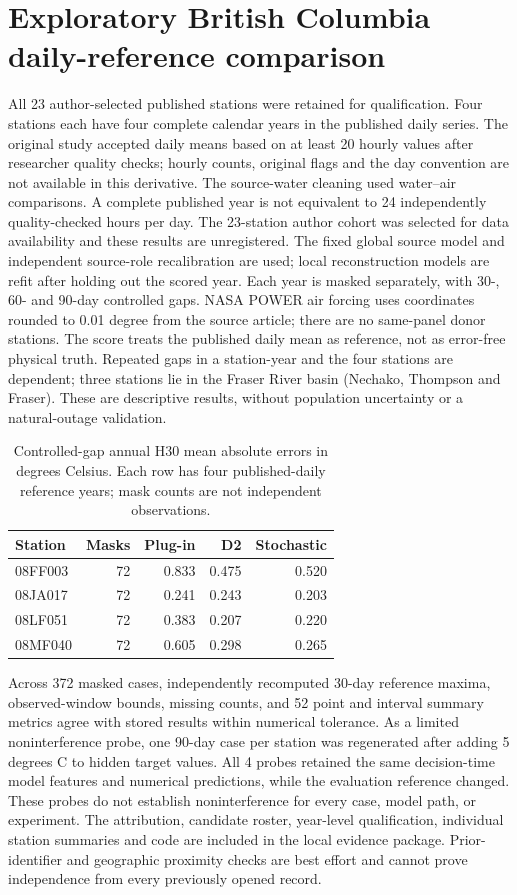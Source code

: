 \section{Exploratory British Columbia daily-reference comparison}
All 23 author-selected published stations were retained for qualification. Four stations each have four complete calendar years in the published daily series. The original study accepted daily means based on at least 20 hourly values after researcher quality checks; hourly counts, original flags and the day convention are not available in this derivative. The source-water cleaning used water--air comparisons. A complete published year is not equivalent to 24 independently quality-checked hours per day. The 23-station author cohort was selected for data availability and these results are unregistered.
The fixed global source model and independent source-role recalibration are used; local reconstruction models are refit after holding out the scored year. Each year is masked separately, with 30-, 60- and 90-day controlled gaps. NASA POWER air forcing uses coordinates rounded to 0.01 degree from the source article; there are no same-panel donor stations. The score treats the published daily mean as reference, not as error-free physical truth. Repeated gaps in a station-year and the four stations are dependent; three stations lie in the Fraser River basin (Nechako, Thompson and Fraser). These are descriptive results, without population uncertainty or a natural-outage validation.
\begin{table}[h]\centering\caption{Controlled-gap annual H30 mean absolute errors in degrees Celsius. Each row has four published-daily reference years; mask counts are not independent observations.}\begin{tabular}{lrrrr}\toprule Station & Masks & Plug-in & D2 & Stochastic \\ \midrule
08FF003 & 72 & 0.833 & 0.475 & 0.520 \\
08JA017 & 72 & 0.241 & 0.243 & 0.203 \\
08LF051 & 72 & 0.383 & 0.207 & 0.220 \\
08MF040 & 72 & 0.605 & 0.298 & 0.265 \\
\bottomrule\end{tabular}\end{table}
Across 372 masked cases, independently recomputed 30-day reference maxima, observed-window bounds, missing counts, and 52 point and interval summary metrics agree with stored results within numerical tolerance. As a limited noninterference probe, one 90-day case per station was regenerated after adding 5 degrees C to hidden target values. All 4 probes retained the same decision-time model features and numerical predictions, while the evaluation reference changed. These probes do not establish noninterference for every case, model path, or experiment.
The attribution, candidate roster, year-level qualification, individual station summaries and code are included in the local evidence package. Prior-identifier and geographic proximity checks are best effort and cannot prove independence from every previously opened record.
